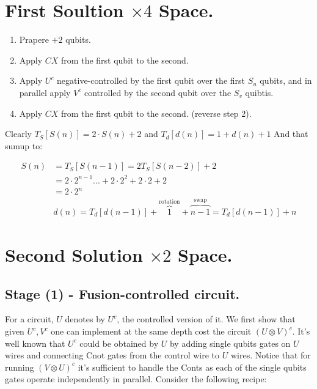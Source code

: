 \documentclass[manuscript,screen,review]{acmart}
\begin{document}
\section{First Soultion $\times 4$ Space.}
\begin{enumerate}
  \item Prapere $+2$ qubits.
  \item Apply $CX$ from the first qubit to the second.
  \item Apply $U^{c}$ negative-controlled by the first qubit over the first $S_{u}$ qubits, and in parallel apply $V^{c}$ controlled by the second qubit over the $S_{v}$ quibtis.   
  \item Apply $CX$ from the first qubit to the second. (reverse step 2).
\end{enumerate}
Clearly $T_{S}[S(n)] = 2 \cdot S(n) + 2$ and $T_{d}[d(n)] = 1 + d(n) + 1$ And that sumup to:

\begin{equation*}
\begin{split}
  S(n) &  = T_{S}[S(n-1)] = 2T_{S}[S(n-2)] + 2   \\
  & = 2\cdot 2^{n - 1}...+2\cdot 2^{2} +2\cdot 2 + 2  \\
  & = 2\cdot 2^{n}  \\ 
  & d(n) = T_{d}[d(n-1)] + \overbrace{1}^{ \text{rotation} } + \overbrace{n-1}^{\text{swap}} =  T_{d}[d(n-1)] + n 
\end{split} 
\end{equation*}

\section{Second Solution $\times 2$ Space. }

\subsection{Stage (1) - Fusion-controlled circuit.}

For a circuit, $U$ denotes by $U^{c}$, the controlled version of it. We first show that given $U^{c},V^{c}$ one can implement at the same depth cost the circuit $(U\otimes V)^{c}$. It's well known that $U^{c}$ could be obtained by $U$ by adding single qubits gates on $U$ wires and connecting Cnot gates from the control wire to $U$ wires. Notice that for running $(V\otimes U)^{c}$ it's sufficient to handle the Conts as each of the single qubits gates operate independently in parallel. Consider the following recipe: 
\end{document}
